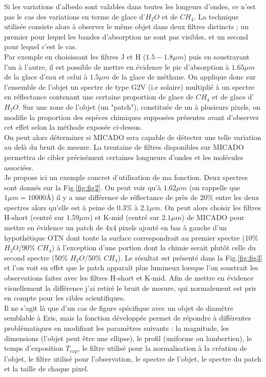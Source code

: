 \documentclass[11pt]{aa}
\begin{document}
Si les variations d'albedo sont valables dans toutes les longeurs d'ondes, ce n'est pas le cas des variations en terme de glace d'$H_2O$ et de $CH_4$. La technique utilisée consiste alors à observer le même objet dans deux filtres distincts ; un premier pour lequel les bandes d'absorption ne sont pas visibles, et un second pour lequel c'est le cas.\\ Par exemple en choisissant les filtres J et H ($1.5-1.8\mu m$) puis en soustrayant l'un à l'autre, il est possible de mettre en évidence le pic d'absorption à $1.65 \mu m$ de la glace d'eau et celui à $1.5 \mu m$ de la glace de méthane.
On applique donc sur l'ensemble de l'objet un spectre de type G2V (i.e solaire) multiplié à un spectre en réflectance contenant une certaine proportion de glace de $CH_4$ et de glace d'$H_2O$. Sur une zone de l'objet (un "patch"), constituée de un à plusieurs pixels, on modifie la proportion des espèces chimiques supposées présentes avant d’observer cet effet selon la méthode exposée ci-dessus. \\ On peut alors déterminer si MICADO sera capable de détecter une telle variation au delà du bruit de mesure. La trentaine de filtres disponibles sur MICADO \citep{carac_tech_et_prez} permettra de cibler précisément certaines longueurs d'ondes et les molécules associées.\\
Je propose ici un exemple concret d'utilisation de ma fonction. Deux spectres sont donnés sur la Fig.\ref{fig:fig2}. On peut voir qu'à $1.62\mu m$ (on rappelle que $1 \mu m = 10000 \text{\AA}$) il y a une différence de réflectance de près de 20\% entre les deux spectres alors qu'elle est à peine de 0.3\% à $2.1\mu m$. On peut alors choisir les filtres H-short (centré sur $1.59\mu m$) et K-mid (centré sur $2.1\mu m$) de MICADO pour mettre en évidence un patch de 4x4 pixels ajouté en bas à gauche d'un hypothétique OTN dont toute la surface correspondrait au premier spectre (10\% $H_2O$/90\% $CH_4$) à l'exception d'une portion dont la chimie serait plutôt celle du second spectre (50\% $H_2O$/50\% $CH_4$). Le résultat est présenté dans la Fig.\ref{fig:fig3} et l'on voit en effet que le patch apparaît plus lumineux lorsque l'on soustrait les observations faites avec les filtres H-short et K-mid. Afin de mettre en évidence visuellement la différence j'ai retiré le bruit de mesure, qui normalement est pris en compte pour les cibles scientifiques.\\ Il ne s'agit là que d'un cas de figure spécifique avec un objet de diamètre semblable à Eris, mais la fonction développée permet de répondre à différentes problématiques en modifiant les paramètres suivants : la magnitude, les dimensions (l'objet peut être une ellipse), le profil (uniforme ou lambertien), le temps d'exposition $T_{exp}$, le filtre utilisé pour la normalisation à la création de l'objet, le filtre utilisé pour l'observation, le spectre de l'objet, le spectre du patch et la taille de chaque pixel.
\end{document}
